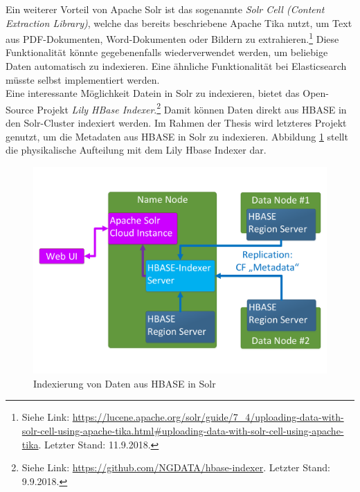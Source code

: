 \noindent
Ein weiterer Vorteil von Apache Solr ist das sogenannte \textit{Solr Cell (Content Extraction Library)}, welche das bereits beschriebene Apache Tika nutzt, um Text aus PDF-Dokumenten, Word-Dokumenten oder Bildern zu extrahieren.\footnote{Siehe Link: \url{https://lucene.apache.org/solr/guide/7_4/uploading-data-with-solr-cell-using-apache-tika.html\#uploading-data-with-solr-cell-using-apache-tika}. Letzter Stand: 11.9.2018.} Diese Funktionalität könnte gegebenenfalls wiederverwendet werden, um beliebige Daten automatisch zu indexieren. Eine ähnliche Funktionalität bei Elasticsearch müsste selbst implementiert werden.\\

\noindent
Eine interessante Möglichkeit Datein in Solr zu indexieren, bietet das Open-Source Projekt \textit{Lily HBase Indexer}.\footnote{Siehe Link: \url{https://github.com/NGDATA/hbase-indexer}. Letzter Stand: 9.9.2018.} Damit können Daten direkt aus HBASE in den Solr-Cluster indexiert werden. 
Im Rahmen der Thesis wird letzteres Projekt genutzt, um die Metadaten aus HBASE in Solr zu indexieren. Abbildung \ref{fig:hbase_solr_indexing} stellt die physikalische Aufteilung mit dem Lily Hbase Indexer dar.\\
\begin{figure}[ht]
  \centering
  \includegraphics[width=\textwidth]{./resource/hbase_solr_indexierung.pdf}
  \caption{Indexierung von Daten aus HBASE in Solr}
  \label{fig:hbase_solr_indexing}
\end{figure}

